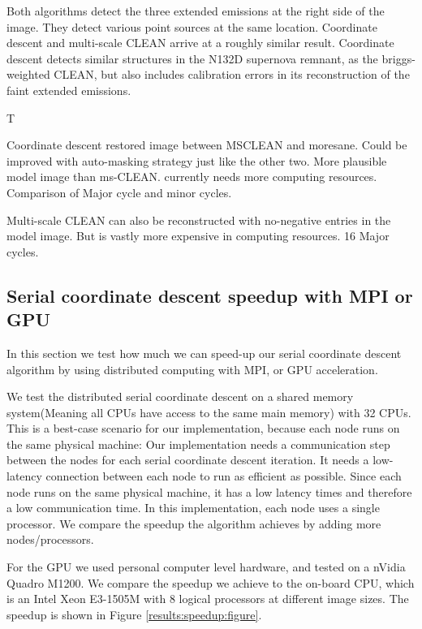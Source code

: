 Both algorithms detect the three extended emissions at the right side of the image. They detect various point sources at the same location. Coordinate descent and multi-scale CLEAN arrive at a roughly similar result. Coordinate descent detects similar structures in the N132D supernova remnant, as the briggs-weighted CLEAN, but also includes calibration errors in its reconstruction of the faint extended emissions.




T

Coordinate descent restored image between MSCLEAN and moresane. Could be improved with auto-masking strategy just like the other two.
More plausible model image than ms-CLEAN. currently needs more computing resources. Comparison of Major cycle and minor cycles.

Multi-scale CLEAN can also be reconstructed with no-negative entries in the model image. But is vastly more expensive in computing resources. 16 Major cycles.


\subsection{Serial coordinate descent speedup with MPI or GPU}\label{results:speedup}
In this section we test how much we can speed-up our serial coordinate descent algorithm by using distributed computing with MPI, or GPU acceleration.

We test the distributed serial coordinate descent on a shared memory system(Meaning all CPUs have access to the same main memory) with 32 CPUs. This is a best-case scenario for our implementation, because each node runs on the same physical machine: Our implementation needs a communication step between the nodes for each serial coordinate descent iteration. It needs a low-latency connection between each node to run as efficient as possible. Since each node runs on the same physical machine, it has a low latency times and therefore a low communication time. In this implementation, each node uses a single processor. We compare the speedup the algorithm achieves by adding more nodes/processors.

For the GPU we used personal computer level hardware, and tested on a nVidia Quadro M1200. We compare the speedup we achieve to the on-board CPU, which is an Intel Xeon E3-1505M with 8 logical processors at different image sizes. The speedup is shown in Figure \ref{results:speedup:figure}.

